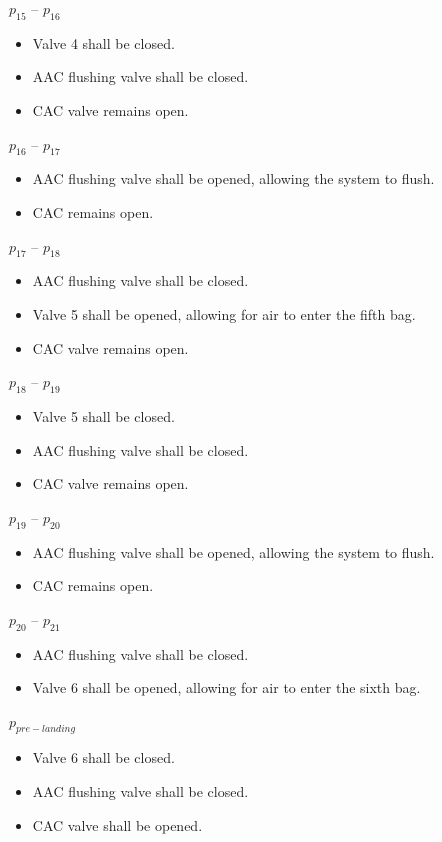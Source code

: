 \documentclass[a4paper,12pt,twoside]{article}
\begin{document}
$p_{15}$ – $p_{16}$
\begin{itemize}
    \item Valve 4 shall be closed.
    \item AAC flushing valve shall be closed.
    \item CAC valve remains open.
\end{itemize}

$p_{16}$ – $p_{17}$
\begin{itemize}
    \item AAC flushing valve shall be opened, allowing the system to flush. 
    \item CAC remains open.
  \end{itemize}

$p_{17}$ – $p_{18}$
\begin{itemize}
    \item AAC flushing valve shall be closed.
    \item Valve 5 shall be opened, allowing for air to enter the fifth bag. 
    \item CAC valve remains open.
\end{itemize}

$p_{18}$ – $p_{19}$
\begin{itemize}
    \item Valve 5 shall be closed.
    \item AAC flushing valve shall be closed.
    \item CAC valve remains open.
\end{itemize}

$p_{19}$ – $p_{20}$
\begin{itemize}
     \item AAC flushing valve shall be opened, allowing the system to flush. 
    \item CAC remains open.
   \end{itemize}

$p_{20}$ – $p_{21}$
\begin{itemize}
    \item AAC flushing valve shall be closed.
    \item Valve 6 shall be opened, allowing for air to enter the sixth bag.
\end{itemize}

$p_{pre-landing}$ 
\begin{itemize}
    \item Valve 6 shall be closed.
    \item AAC flushing valve shall be closed.
    \item CAC valve shall be opened.
\end{itemize}
\end{document}
